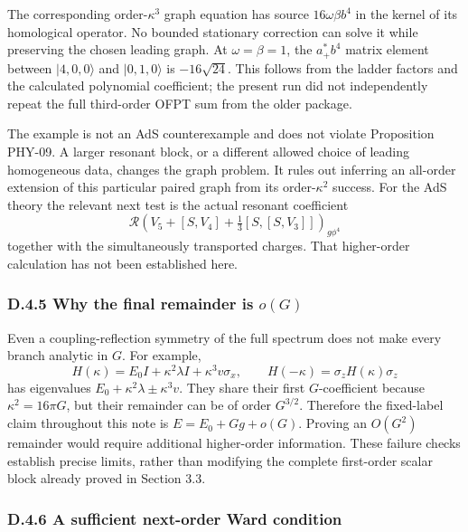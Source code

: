 The corresponding order-\(\kappa^3\) graph equation has source \(16\omega\beta b^4\) in the kernel of its homological operator. No bounded stationary correction can solve it while preserving the chosen leading graph. At \(\omega=\beta=1\), the \(a_+^*b^4\) matrix element between \(|4,0,0\rangle\) and \(|0,1,0\rangle\) is \(-16\sqrt{24}\). This follows from the ladder factors and the calculated polynomial coefficient; the present run did not independently repeat the full third-order OFPT sum from the older package.

The example is not an AdS counterexample and does not violate Proposition PHY-09. A larger resonant block, or a different allowed choice of leading homogeneous data, changes the graph problem. It rules out inferring an all-order extension of this particular paired graph from its order-\(\kappa^2\) success. For the AdS theory the relevant next test is the actual resonant coefficient \[
\mathcal R\left(V_5+[S,V_4]+\tfrac13[S,[S,V_3]]\right)_{g\phi^4}
\tag{D.22}
\] together with the simultaneously transported charges. That higher-order calculation has not been established here.

\hypertarget{d.4.5-why-the-final-remainder-is-og}{%
\subsubsection{\texorpdfstring{D.4.5 Why the final remainder is \(o(G)\)}{D.4.5 Why the final remainder is o(G)}}\label{d.4.5-why-the-final-remainder-is-og}}

Even a coupling-reflection symmetry of the full spectrum does not make every branch analytic in \(G\). For example, \[
H(\kappa)=E_0I+\kappa^2\lambda I+\kappa^3v\sigma_x,
\qquad
H(-\kappa)=\sigma_zH(\kappa)\sigma_z
\tag{D.23}
\] has eigenvalues \(E_0+\kappa^2\lambda\pm\kappa^3v\). They share their first \(G\)-coefficient because \(\kappa^2=16\pi G\), but their remainder can be of order \(G^{3/2}\). Therefore the fixed-label claim throughout this note is \(E=E_0+Gg+o(G)\). Proving an \(O(G^2)\) remainder would require additional higher-order information. These failure checks establish precise limits, rather than modifying the complete first-order scalar block already proved in Section 3.3.

\hypertarget{d.4.6-a-sufficient-next-order-ward-condition}{%
\subsubsection{D.4.6 A sufficient next-order Ward condition}\label{d.4.6-a-sufficient-next-order-ward-condition}}

